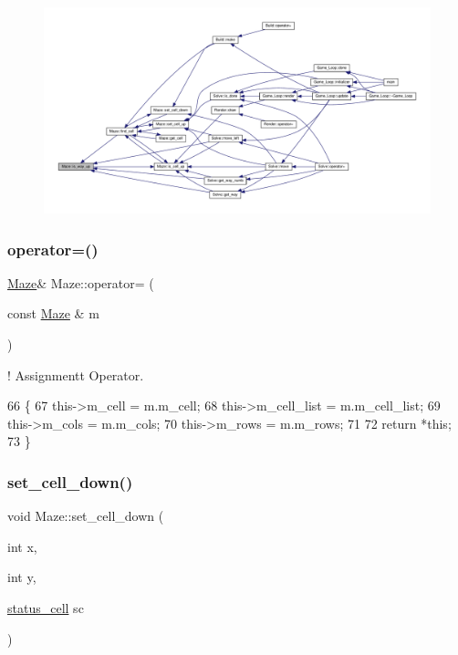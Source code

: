 \begin{figure}[H]
\begin{center}
\leavevmode
\includegraphics[width=350pt]{classMaze_a308fa695665de6217c0e7f28aab5adda_icgraph}
\end{center}
\end{figure}
\mbox{\label{classMaze_a41468a30ae450b06d4a07304e9cda5ed}} 
\subsubsection{\texorpdfstring{operator=()}{operator=()}}
{\footnotesize\ttfamily \hyperlink{classMaze}{Maze}\& Maze\+::operator= (\begin{DoxyParamCaption}\item[{const \hyperlink{classMaze}{Maze} \&}]{m }\end{DoxyParamCaption})\hspace{0.3cm}{\ttfamily [inline]}}



! Assignmentt Operator. 


\begin{DoxyCode}
66         \{
67             this->m\_cell = m.m\_cell;
68             this->m\_cell\_list = m.m\_cell\_list;
69             this->m\_cols = m.m\_cols;
70             this->m\_rows = m.m\_rows;
71             
72             \textcolor{keywordflow}{return} *\textcolor{keyword}{this};
73         \}
\end{DoxyCode}
\mbox{\label{classMaze_ab86292a84aa56a26c4c07f4aa684d9bb}} 
\subsubsection{\texorpdfstring{set\+\_\+cell\+\_\+down()}{set\_cell\_down()}\hspace{0.1cm}{\footnotesize\ttfamily [1/2]}}
{\footnotesize\ttfamily void Maze\+::set\+\_\+cell\+\_\+down (\begin{DoxyParamCaption}\item[{int}]{x,  }\item[{int}]{y,  }\item[{\hyperlink{classMaze_a07167e321eac2b67100fb82ecb98f1d1}{status\+\_\+cell}}]{sc }\end{DoxyParamCaption})}



